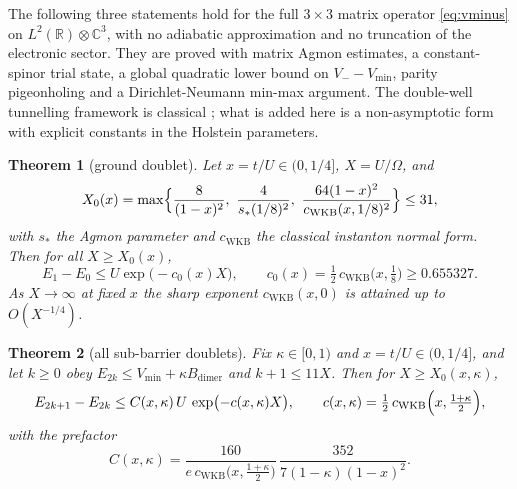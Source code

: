 \documentclass[11pt]{article}
\newtheorem{theorem}{Theorem}[section]
\theoremstyle{definition}
\theoremstyle{remark}
\begin{document}
The following three statements hold for the full $3\times3$ matrix operator
\eqref{eq:vminus} on $L^{2}(\mathbb{R})\otimes\mathbb{C}^{3}$, with no adiabatic
approximation and no truncation of the electronic sector. They are proved with
matrix Agmon estimates, a constant-spinor trial state, a global quadratic lower
bound on $V_{-}-V_{\min}$, parity pigeonholing and a Dirichlet-Neumann min-max
argument. The double-well tunnelling framework is classical
\cite{simon1984,hs1984,harrell1980,martinez1989,kmsm1992}; what is added here is a
non-asymptotic form with explicit constants in the Holstein parameters.

\begin{theorem}[ground doublet]\label{thm:valleyground}
Let $x=t/U\in(0,1/4]$, $X=U/\Omega$, and
\begin{equation}
X_{0}(x)=\max\Bigl\{\frac{8}{(1-x)^{2}},\
\frac{4}{s_{*}(1/8)^{2}},\
\frac{64(1-x)^{2}}{c_{\mathrm{WKB}}(x,1/8)^{2}}\Bigr\}\le31 ,
\label{eq:X0}
\end{equation}
with $s_{*}$ the Agmon parameter and $c_{\mathrm{WKB}}$ the classical
instanton normal form. Then for all $X\ge X_{0}(x)$,
\begin{equation}
E_{1}-E_{0}\le U\exp\bigl(-c_{0}(x)X\bigr),\qquad
c_{0}(x)=\tfrac12\,c_{\mathrm{WKB}}\bigl(x,\tfrac18\bigr)\ge0.655327 .
\label{eq:valleyground}
\end{equation}
As $X\to\infty$ at fixed $x$ the sharp exponent
$c_{\mathrm{WKB}}(x,0)$ is attained up to $O(X^{-1/4})$.
\end{theorem}

\begin{theorem}[all sub-barrier doublets]\label{thm:valleydoublets}
Fix $\kappa\in[0,1)$ and $x=t/U\in(0,1/4]$, and let $k\ge0$ obey
$E_{2k}\le V_{\min}+\kappa B_{\mathrm{dimer}}$ and $k+1\le11X$. Then for
$X\ge X_{0}(x,\kappa)$,
\begin{equation}
E_{2k+1}-E_{2k}\le C(x,\kappa)\,U\,\exp\bigl(-c(x,\kappa)X\bigr),\qquad
c(x,\kappa)=\tfrac12\,c_{\mathrm{WKB}}\Bigl(x,\tfrac{1+\kappa}{2}\Bigr),
\label{eq:valleydoublets}
\end{equation}
with the prefactor
\begin{equation}
C(x,\kappa)=\frac{160}{e\,c_{\mathrm{WKB}}\bigl(x,\tfrac{1+\kappa}{2}\bigr)}\,
\frac{352}{7(1-\kappa)(1-x)^{2}}.
\label{eq:valleyC}
\end{equation}
\end{theorem}
\end{document}
